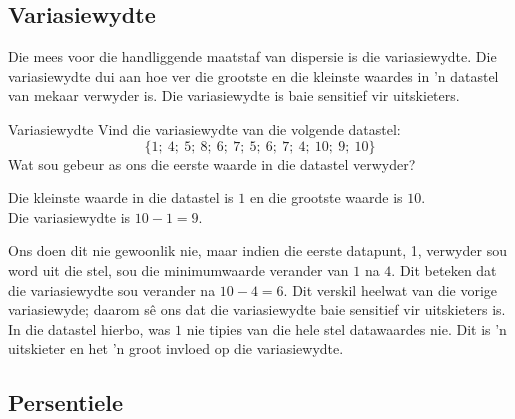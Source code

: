 \subsection{Variasiewydte}

Die mees voor die handliggende  maatstaf van dispersie is die variasiewydte. Die variasiewydte dui aan hoe ver die grootste en die kleinste waardes in ’n datastel van mekaar verwyder is. Die variasiewydte is baie sensitief vir uitskieters.

\begin{wex}{Variasiewydte}
{Vind die variasiewydte van die volgende datastel:
    \begin{equation*}
      \{1;\ 4;\ 5;\ 8;\ 6;\ 7;\ 5;\ 6;\ 7;\ 4;\ 10;\ 9;\ 10\}
    \end{equation*}
    Wat sou gebeur as ons die eerste waarde in die datastel verwyder?
}{
  Die kleinste waarde in die datastel is $1$ en die grootste waarde is $10$.\\
  Die variasiewydte is $10-1=9$.

  Ons doen dit nie gewoonlik nie, maar indien die eerste datapunt, 1, verwyder sou word uit die stel, sou die minimumwaarde verander van $1$ na $4$. Dit beteken dat die variasiewydte sou verander na $10- 4 = 6$. Dit verskil heelwat van die vorige variasiewyde; daarom sê ons dat die variasiewydte baie sensitief vir uitskieters is. In die datastel hierbo, was $1$ nie tipies van die hele stel datawaardes nie. Dit is ’n uitskieter en het ’n groot invloed op die variasiewydte. 
}
\end{wex}


\subsection{Persentiele}


